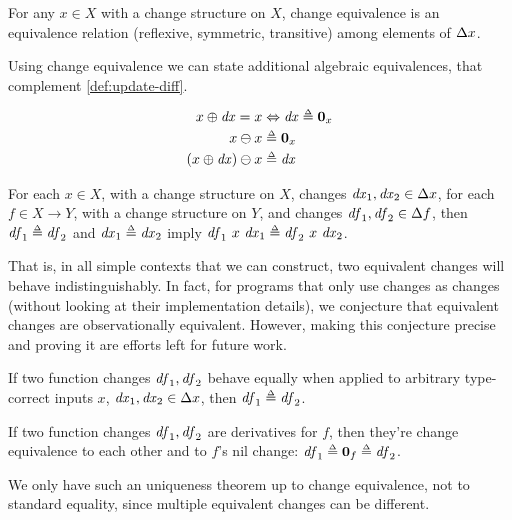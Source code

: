 \begin{lemma}
  For any $x \in X$ with a change structure on $X$, change equivalence is an
  equivalence relation (reflexive, symmetric, transitive) among
  elements of $\Change{x}$.
\end{lemma}

\begin{lemma}
  Using change equivalence we can state additional algebraic equivalences,
  that complement \cref{def:update-diff}.

\begin{align*}
\Update x \D{x} = x &\Leftrightarrow \D{x} \Doe \NilC{x}\\
\Diff x x &\Doe \NilC {x}\\
\Diff {\Update*{x}{\D{x}}} x &\Doe \D{x}
\end{align*}
\end{lemma}

\begin{lemma}
  For each $x \in X$, with a change structure on $X$, changes
  $\D{x}_1, \D{x}_2 \in \Change{x}$, for each $f \in X \to Y$,
with a change structure on $Y$, and changes
$\D{f}_1, \D{f}_2 \in \Change{f}$, then $\D{f}_1 \Doe \D{f}_2$ and
$\D{x}_1 \Doe \D{x}_2$ imply
$\D{f}_1~x~\D{x}_1 \Doe \D{f}_2~x~\D{x}_2$.
\end{lemma}

That is, in all simple contexts that we can construct, two equivalent
changes will behave indistinguishably. In fact, for programs that
only use changes as changes (without looking at their
implementation details), we conjecture that equivalent changes are
observationally equivalent. However, making this conjecture
precise and proving it are efforts left for future work.

\begin{lemma}
  If two function changes $\mathit{df}_1, \mathit{df}_2$ behave equally when
  applied to arbitrary type-correct inputs $x$,
  $\D{x}_1, \D{x}_2 \in \Change{x}$, then $\D{f}_1 \Doe \D{f}_2$.
\end{lemma}

\begin{lemma}
  If two function changes $\mathit{df}_1, \mathit{df}_2$ are derivatives for
  $f$, then they're change equivalence to each other and to $f$'s nil change:
  $\D{f}_1 \Doe \NilC{f} \Doe \D{f}_2$.
\end{lemma}
We only have such an uniqueness theorem up to change equivalence, not to
standard equality, since multiple equivalent changes can be
different.
